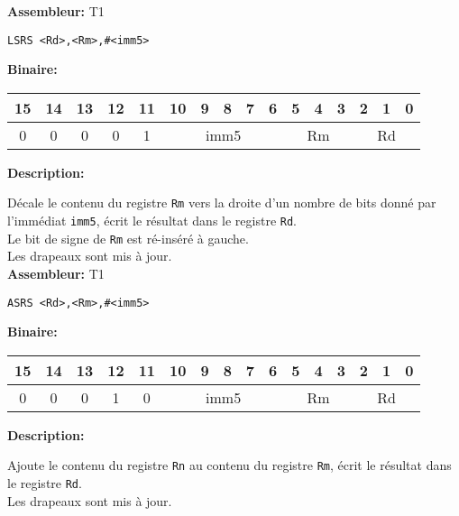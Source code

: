 \documentclass{article}
\newcounter{subsubsubsection}[subsubsection]
\begin{document}
\textbf{Assembleur:} T1

\begin{lstlisting}
LSRS <Rd>,<Rm>,#<imm5>
\end{lstlisting}

\textbf{Binaire:}\\

\begin{tabular}{| c c c c c c c c c c c c c c c c |}
\hline
15 & 14 & 13 & \multicolumn{1}{|c}{12} & 11 & \multicolumn{1}{|c}{10} & 9 & 8 & 7 & 6 & \multicolumn{1}{|c}{5} & 4 & 3 & \multicolumn{1}{|c}{2} & 1 & 0 \\
\hline   
0 & 0 & 0 & \multicolumn{1}{|c}{0} & 1 & \multicolumn{5}{|c|}{imm5} & \multicolumn{3}{|c|}{Rm} & \multicolumn{3}{|c|}{Rd} \\
\hline
\end{tabular}



\textbf{Description: }

Décale le contenu du registre \texttt{Rm} vers la droite d'un nombre de bits donné par l'immédiat \texttt{imm5}, écrit le résultat dans le registre \texttt{Rd}.\\
Le bit de signe de \texttt{Rm} est ré-inséré à gauche.\\
Les drapeaux sont mis à jour.\\

\textbf{Assembleur:} T1

\begin{lstlisting}
ASRS <Rd>,<Rm>,#<imm5>
\end{lstlisting}

\textbf{Binaire:}\\

\begin{tabular}{| c c c c c c c c c c c c c c c c |}
\hline
15 & 14 & 13 & \multicolumn{1}{|c}{12} & 11 & \multicolumn{1}{|c}{10} & 9 & 8 & 7 & 6 & \multicolumn{1}{|c}{5} & 4 & 3 & \multicolumn{1}{|c}{2} & 1 & 0 \\
\hline   
0 & 0 & 0 & \multicolumn{1}{|c}{1} & 0 & \multicolumn{5}{|c|}{imm5} & \multicolumn{3}{|c|}{Rm} & \multicolumn{3}{|c|}{Rd} \\
\hline
\end{tabular}



\textbf{Description: }

Ajoute le contenu du registre \texttt{Rn} au contenu du registre \texttt{Rm}, écrit le résultat dans le registre \texttt{Rd}.\\
Les drapeaux sont mis à jour.\\
\end{document}
